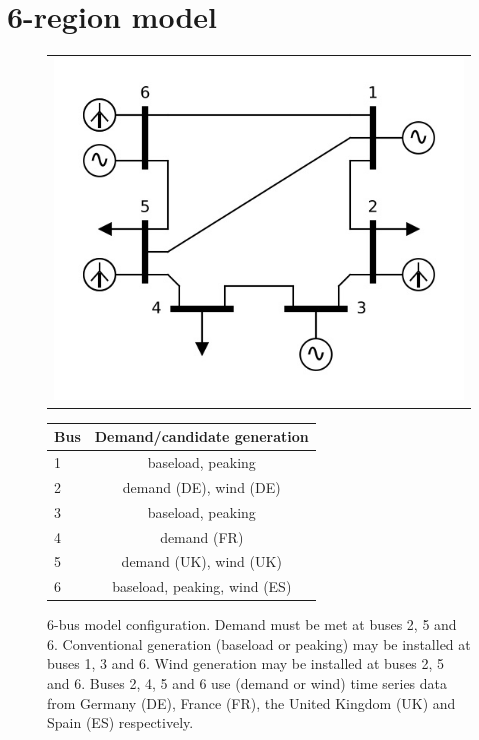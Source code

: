 \documentclass[preprint]{elsarticle}
\begin{document}
\newpage
\section{6-region model}

\begin{figure}
  \begin{tabular}{c}
    \includegraphics[scale=0.3, trim=10 40 10 40, clip]{6_region_diagram.jpg}
  \end{tabular}
  \begin{tabular}{ l  c}
  Bus & Demand/candidate generation \\ \hline
  1 & baseload, peaking \\
  2 & demand (DE), wind (DE) \\
  3 & baseload, peaking \\
  4 & demand (FR) \\
  5 & demand (UK), wind (UK) \\
  6 & baseload, peaking, wind (ES) \\ \hline
\end{tabular}
  \caption{6-bus model configuration. Demand must be met at buses 2, 5 and 6. Conventional generation (baseload or peaking) may be installed at buses 1, 3 and 6. Wind generation may be installed at buses 2, 5 and 6. Buses 2, 4, 5 and 6 use (demand or wind) time series data from Germany (DE), France (FR), the United Kingdom (UK) and Spain (ES) respectively.}
  \label{fig:model_2:model_diagram}
\end{figure}
\end{document}
